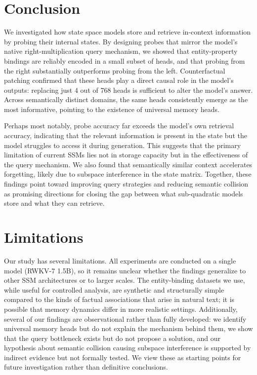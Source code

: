 \documentclass[11pt]{article}
\begin{document}
\section{Conclusion}
\label{sec:conclusion}

We investigated how state space models store and retrieve in-context information by probing their internal states. By designing probes that mirror the model's native right-multiplication query mechanism, we showed that entity-property bindings are reliably encoded in a small subset of heads, and that probing from the right substantially outperforms probing from the left. Counterfactual patching confirmed that these heads play a direct causal role in the model's outputs: replacing just 4 out of 768 heads is sufficient to alter the model's answer. Across semantically distinct domains, the same heads consistently emerge as the most informative, pointing to the existence of universal memory heads.

Perhaps most notably, probe accuracy far exceeds the model's own retrieval accuracy, indicating that the relevant information is present in the state but the model struggles to access it during generation. This suggests that the primary limitation of current SSMs lies not in storage capacity but in the effectiveness of the query mechanism. We also found that semantically similar context accelerates forgetting, likely due to subspace interference in the state matrix. Together, these findings point toward improving query strategies and reducing semantic collision as promising directions for closing the gap between what sub-quadratic models store and what they can retrieve.

\section{Limitations}
\label{sec:limitations}

Our study has several limitations. All experiments are conducted on a single model (RWKV-7 1.5B), so it remains unclear whether the findings generalize to other SSM architectures or to larger scales. The entity-binding datasets we use, while useful for controlled analysis, are synthetic and structurally simple compared to the kinds of factual associations that arise in natural text; it is possible that memory dynamics differ in more realistic settings. Additionally, several of our findings are observational rather than fully developed: we identify universal memory heads but do not explain the mechanism behind them, we show that the query bottleneck exists but do not propose a solution, and our hypothesis about semantic collision causing subspace interference is supported by indirect evidence but not formally tested. We view these as starting points for future investigation rather than definitive conclusions.
\end{document}
